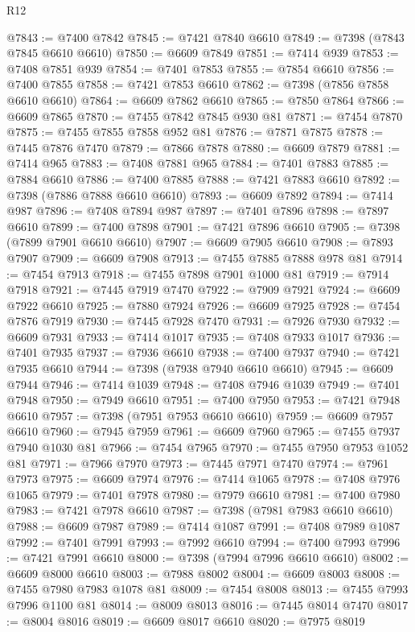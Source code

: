 \begin{lexlean}{R12}
\begin{coremodule}
{{{{{{{{{{{{{{{{{{{{{{{{{{{{{{{{{{{{{{{{{{{{{{{{{{{{{{{{{{{{{{{{{{{{{{{{{{{{{{{{{{@7843 := @7400 @7842
@7845 := @7421 @7840 @6610
@7849 := @7398 (@7843 @7845 @6610 @6610)
@7850 := @6609 @7849
@7851 := @7414 @939
@7853 := @7408 @7851 @939
@7854 := @7401 @7853
@7855 := @7854 @6610
@7856 := @7400 @7855
@7858 := @7421 @7853 @6610
@7862 := @7398 (@7856 @7858 @6610 @6610)
@7864 := @6609 @7862 @6610
@7865 := @7850 @7864
@7866 := @6609 @7865
@7870 := @7455 @7842 @7845 @930 @81
@7871 := @7454 @7870
@7875 := @7455 @7855 @7858 @952 @81
@7876 := @7871 @7875
@7878 := @7445 @7876 @7470
@7879 := @7866 @7878
@7880 := @6609 @7879
@7881 := @7414 @965
@7883 := @7408 @7881 @965
@7884 := @7401 @7883
@7885 := @7884 @6610
@7886 := @7400 @7885
@7888 := @7421 @7883 @6610
@7892 := @7398 (@7886 @7888 @6610 @6610)
@7893 := @6609 @7892
@7894 := @7414 @987
@7896 := @7408 @7894 @987
@7897 := @7401 @7896
@7898 := @7897 @6610
@7899 := @7400 @7898
@7901 := @7421 @7896 @6610
@7905 := @7398 (@7899 @7901 @6610 @6610)
@7907 := @6609 @7905 @6610
@7908 := @7893 @7907
@7909 := @6609 @7908
@7913 := @7455 @7885 @7888 @978 @81
@7914 := @7454 @7913
@7918 := @7455 @7898 @7901 @1000 @81
@7919 := @7914 @7918
@7921 := @7445 @7919 @7470
@7922 := @7909 @7921
@7924 := @6609 @7922 @6610
@7925 := @7880 @7924
@7926 := @6609 @7925
@7928 := @7454 @7876 @7919
@7930 := @7445 @7928 @7470
@7931 := @7926 @7930
@7932 := @6609 @7931
@7933 := @7414 @1017
@7935 := @7408 @7933 @1017
@7936 := @7401 @7935
@7937 := @7936 @6610
@7938 := @7400 @7937
@7940 := @7421 @7935 @6610
@7944 := @7398 (@7938 @7940 @6610 @6610)
@7945 := @6609 @7944
@7946 := @7414 @1039
@7948 := @7408 @7946 @1039
@7949 := @7401 @7948
@7950 := @7949 @6610
@7951 := @7400 @7950
@7953 := @7421 @7948 @6610
@7957 := @7398 (@7951 @7953 @6610 @6610)
@7959 := @6609 @7957 @6610
@7960 := @7945 @7959
@7961 := @6609 @7960
@7965 := @7455 @7937 @7940 @1030 @81
@7966 := @7454 @7965
@7970 := @7455 @7950 @7953 @1052 @81
@7971 := @7966 @7970
@7973 := @7445 @7971 @7470
@7974 := @7961 @7973
@7975 := @6609 @7974
@7976 := @7414 @1065
@7978 := @7408 @7976 @1065
@7979 := @7401 @7978
@7980 := @7979 @6610
@7981 := @7400 @7980
@7983 := @7421 @7978 @6610
@7987 := @7398 (@7981 @7983 @6610 @6610)
@7988 := @6609 @7987
@7989 := @7414 @1087
@7991 := @7408 @7989 @1087
@7992 := @7401 @7991
@7993 := @7992 @6610
@7994 := @7400 @7993
@7996 := @7421 @7991 @6610
@8000 := @7398 (@7994 @7996 @6610 @6610)
@8002 := @6609 @8000 @6610
@8003 := @7988 @8002
@8004 := @6609 @8003
@8008 := @7455 @7980 @7983 @1078 @81
@8009 := @7454 @8008
@8013 := @7455 @7993 @7996 @1100 @81
@8014 := @8009 @8013
@8016 := @7445 @8014 @7470
@8017 := @8004 @8016
@8019 := @6609 @8017 @6610
@8020 := @7975 @8019
}}}}}}}}}}}}}}}}}}}}}}}}}}}}}}}}}}}}}}}}}}}}}}}}}}}}}}}}}}}}}}}}}}}}}}}}}}}}}}}}}}
\end{coremodule}
\end{lexlean}
